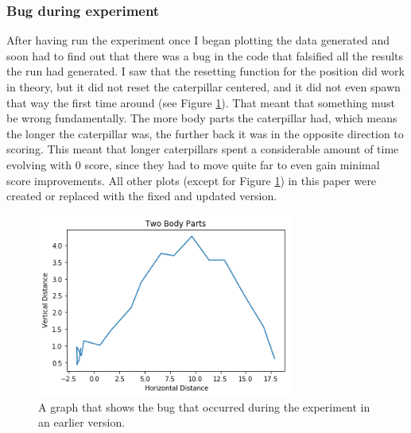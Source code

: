\documentclass[12pt,oneside,listof=totoc,paper=a4,headings=small]{scrbook}
\begin{document}
\subsubsection{Bug during experiment} 
After having run the experiment once I began plotting the data generated and soon had to find out that there was a bug in the code that falsified all the results the run had generated. I saw that the resetting function for the position did work in theory, but it did not reset the caterpillar centered, and it did not even spawn that way the first time around (see Figure \ref{fig:TwoPartsBugged}). That meant that something must be wrong fundamentally.
The more body parts the caterpillar had, which means the longer the caterpillar was, the further back it was in the opposite direction to scoring. This meant that longer caterpillars spent a considerable amount of time evolving with 0 score, since they had to move quite far to even gain minimal score improvements.
All other plots (except for Figure \ref{fig:TwoPartsBugged}) in this paper were created or replaced with the fixed and updated version.
\newpage
\begin{figure}[h!]
\centering
\includegraphics[width=0.75\textwidth,height=0.75\textheight,keepaspectratio]{images/2parts_bug.png}
\caption{A graph that shows the bug that occurred during the experiment in an earlier version.}
\label{fig:TwoPartsBugged}
\end{figure}
\end{document}
